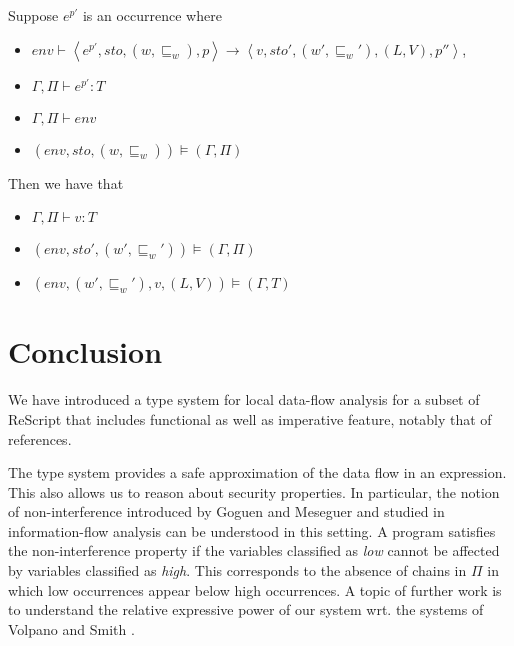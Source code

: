\documentclass{llncs}
\newcommand{\sqleq}{\ensuremath{\sqsubseteq\xspace}}
\begin{document}
\begin{theorem}[Soundness]
	Suppose $e^{p'}$ is an occurrence where
	\begin{itemize}
		\item $env\vdash\left\langle e^{p'},sto,(w,\sqleq_w),p\right\rangle\rightarrow\left\langle v,sto',(w',\sqleq_w'),(L,V),p''\right\rangle$,
		\item $\Gamma,\Pi\vdash e^{p'} : T$
		\item $\Gamma,\Pi\vdash env$
		\item $(env,sto,(w,\sqleq_w))\models(\Gamma,\Pi)$
	\end{itemize}
	Then we have that
	\begin{itemize}
		\item $\Gamma,\Pi\vdash v:T$
		\item $(env,sto',(w',\sqleq_w'))\models(\Gamma,\Pi)$
		\item $(env,(w',\sqleq_w'),v,(L,V))\models(\Gamma,T)$
	\end{itemize}
\end{theorem}


% 

\section{Conclusion}\label{sec:Conc}

We have introduced a type system for local data-flow analysis for a
subset of ReScript that includes functional as well as imperative
feature, notably that of references.

The type system provides a safe approximation of the data flow in an
expression. This also allows us to reason about security
properties. In particular, the notion of non-interference introduced
by Goguen and Meseguer \cite{goguen-meseguer} and studied in information-flow analysis can be
understood in this setting. A program satisfies the non-interference
property if the variables classified as \emph{low} cannot be affected
by variables classified as \emph{high}. This corresponds to the
absence of chains in $\Pi$ in which low occurrences appear below high
occurrences. A topic of further work is to understand the relative
expressive power of our system wrt. the systems of Volpano and Smith
\cite{volpano-smith-96,volpano-smith-97}.
\end{document}
